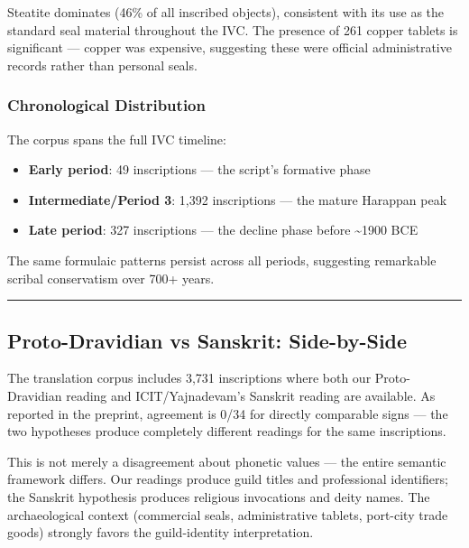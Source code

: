 \documentclass[
  11pt,
]{article}
\providecommand{\tightlist}{%
  \setlength{\itemsep}{0pt}\setlength{\parskip}{0pt}}
\begin{document}
Steatite dominates (46\% of all inscribed objects), consistent with its
use as the standard seal material throughout the IVC. The presence of
261 copper tablets is significant --- copper was expensive, suggesting
these were official administrative records rather than personal seals.

\subsubsection{Chronological
Distribution}\label{chronological-distribution}

The corpus spans the full IVC timeline:

\begin{itemize}
\tightlist
\item
  \textbf{Early period}: 49 inscriptions --- the script's formative
  phase
\item
  \textbf{Intermediate/Period 3}: 1,392 inscriptions --- the mature
  Harappan peak
\item
  \textbf{Late period}: 327 inscriptions --- the decline phase before
  \textasciitilde1900 BCE
\end{itemize}

The same formulaic patterns persist across all periods, suggesting
remarkable scribal conservatism over 700+ years.

\begin{center}\rule{0.5\linewidth}{0.5pt}\end{center}

\subsection{Proto-Dravidian vs Sanskrit:
Side-by-Side}\label{proto-dravidian-vs-sanskrit-side-by-side}

The translation corpus includes 3,731 inscriptions where both our
Proto-Dravidian reading and ICIT/Yajnadevam's Sanskrit reading are available.
As reported in the preprint, agreement is 0/34 for directly comparable
signs --- the two hypotheses produce completely different readings for
the same inscriptions.

This is not merely a disagreement about phonetic values --- the entire
semantic framework differs. Our readings produce guild titles and
professional identifiers; the Sanskrit hypothesis produces religious
invocations and deity names. The archaeological context (commercial
seals, administrative tablets, port-city trade goods) strongly favors
the guild-identity interpretation.
\end{document}
